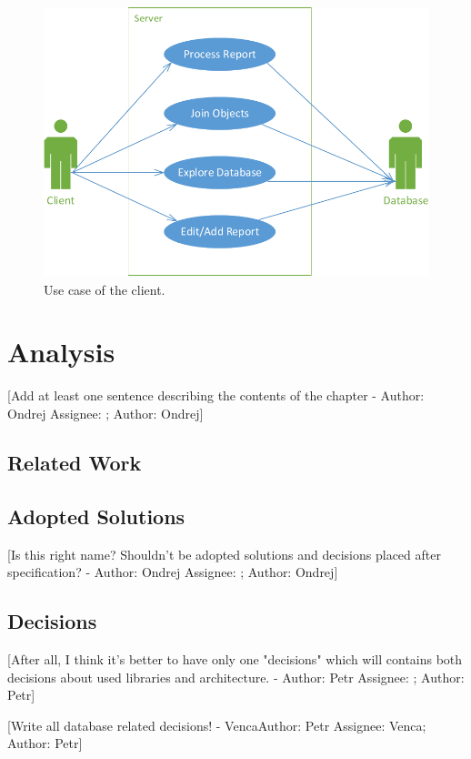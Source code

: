 \documentclass[12pt,a4paper]{report}
\makeatletter
\newcommand{\comment}[3][\@empty]{
  {\color{magenta}[#3 - }
  {\color{green}\ifx\@empty#1\relax Author: #2 \else Assignee: #1; Author: #2\fi}{\color{magenta}]}
}
\makeatother
\begin{document}
\begin{figure}[!htb]
        \centering
        \includegraphics[width=\textwidth]{Images/UseCase2}
        \caption{Use case of the client.}
        \label{fig:UseCase2}
\end{figure}

\chapter{Analysis}

\comment{Ondrej}{Add at least one sentence describing the contents of the
chapter}

\section{Related Work}


\section{Adopted Solutions}
\comment{Ondrej}{Is this right name? Shouldn't be adopted solutions and decisions placed after specification?}



\section{Decisions}
\label{sec:Decisions}

\comment{Petr}{After all, I think it's better to have only one "decisions" which
will contains both decisions about used libraries and architecture.}

\comment[Venca]{Petr}{\huge{Write all database related decisions!}}
\end{document}
